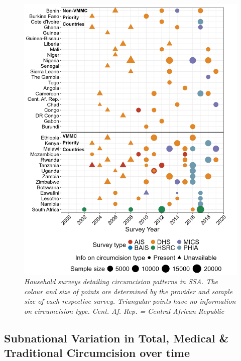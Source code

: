 \documentclass{article}
\begin{document}
\begin{figure}[H]
    \centering
    \includegraphics[width=.9\linewidth]
    {plots/01_survey_table.png}
    \caption{\emph{Household surveys detailing circumcision patterns in SSA. The colour and size of points are determined by the provider and sample size of each respective survey. Triangular points have no information on circumcision type. Cent. Af. Rep. = Central African Republic}}
\end{figure}

\subsection{Subnational Variation in Total, Medical \& Traditional Circumcision over time}
\label{sec:org0d1ffe6}
\end{document}
